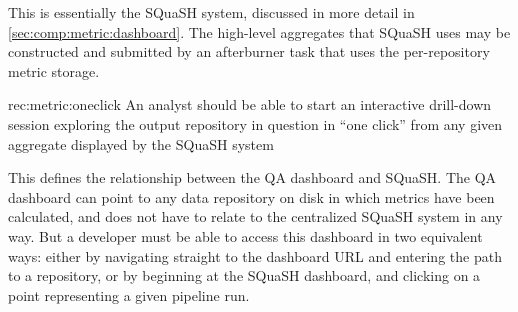 This is essentially the SQuaSH system, discussed in more detail in \ref{sec:comp:metric:dashboard}.
The high-level aggregates that SQuaSH uses may be constructed and submitted by an afterburner task that uses the per-repository metric storage.

\begin{recommendation}
    {rec:metric:oneclick}
    {An analyst should be able to start an interactive drill-down session exploring the output repository in question in ``one click'' from any given aggregate displayed by the SQuaSH system}
\end{recommendation}

This defines the relationship between the QA dashboard and SQuaSH.
The QA dashboard can point to any data repository on disk in which metrics have been calculated, and does not have to relate to the centralized SQuaSH system in any way.
But a developer must be able to access this dashboard in two equivalent ways: either by navigating straight to the dashboard URL and entering the path to a repository, or by beginning at the SQuaSH dashboard, and clicking on a point representing a given pipeline run.
